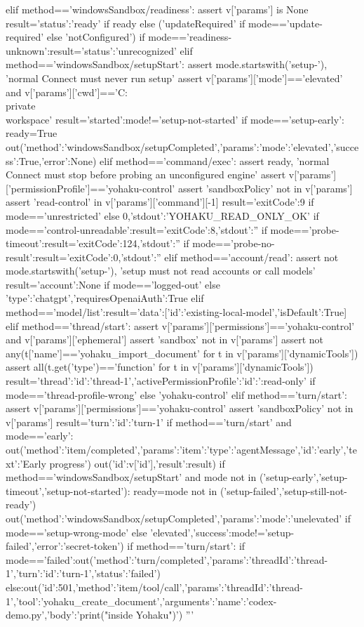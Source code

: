  elif method=='windowsSandbox/readiness':
  assert v['params'] is None
  result={'status':'ready' if ready else ('updateRequired' if mode=='update-required' else 'notConfigured')}
  if mode=='readiness-unknown':result={'status':'unrecognized'}
 elif method=='windowsSandbox/setupStart':
  assert mode.startswith('setup-'), 'normal Connect must never run setup'
  assert v['params']['mode']=='elevated' and v['params']['cwd']=='C:\\private\\workspace'
  result={'started':mode!='setup-not-started'}
  if mode=='setup-early':
   ready=True
   out({'method':'windowsSandbox/setupCompleted','params':{'mode':'elevated','success':True,'error':None}})
 elif method=='command/exec':
  assert ready, 'normal Connect must stop before probing an unconfigured engine'
  assert v['params']['permissionProfile']=='yohaku-control'
  assert 'sandboxPolicy' not in v['params']
  assert 'read-control' in v['params']['command'][-1]
  result={'exitCode':9 if mode=='unrestricted' else 0,'stdout':'YOHAKU_READ_ONLY_OK'}
  if mode=='control-unreadable':result={'exitCode':8,'stdout':''}
  if mode=='probe-timeout':result={'exitCode':124,'stdout':''}
  if mode=='probe-no-result':result={'exitCode':0,'stdout':''}
 elif method=='account/read':
  assert not mode.startswith('setup-'), 'setup must not read accounts or call models'
  result={'account':None if mode=='logged-out' else {'type':'chatgpt'},'requiresOpenaiAuth':True}
 elif method=='model/list':result={'data':[{'id':'existing-local-model','isDefault':True}]}
 elif method=='thread/start':
  assert v['params']['permissions']=='yohaku-control' and v['params']['ephemeral']
  assert 'sandbox' not in v['params']
  assert not any(t['name']=='yohaku_import_document' for t in v['params']['dynamicTools'])
  assert all(t.get('type')=='function' for t in v['params']['dynamicTools'])
  result={'thread':{'id':'thread-1'},'activePermissionProfile':{'id':':read-only' if mode=='thread-profile-wrong' else 'yohaku-control'}}
 elif method=='turn/start':
  assert v['params']['permissions']=='yohaku-control'
  assert 'sandboxPolicy' not in v['params']
  result={'turn':{'id':'turn-1'}}
 if method=='turn/start' and mode=='early':
  out({'method':'item/completed','params':{'item':{'type':'agentMessage','id':'early','text':'Early progress'}}})
 out({'id':v['id'],'result':result})
 if method=='windowsSandbox/setupStart' and mode not in ('setup-early','setup-timeout','setup-not-started'):
  ready=mode not in ('setup-failed','setup-still-not-ready')
  out({'method':'windowsSandbox/setupCompleted','params':{'mode':'unelevated' if mode=='setup-wrong-mode' else 'elevated','success':mode!='setup-failed','error':'secret-token'}})
 if method=='turn/start':
  if mode=='failed':out({'method':'turn/completed','params':{'threadId':'thread-1','turn':{'id':'turn-1','status':'failed'}}})
  else:out({'id':501,'method':'item/tool/call','params':{'threadId':'thread-1','tool':'yohaku_create_document','arguments':{'name':'codex-demo.py','body':'print("inside Yohaku")\n'}}})
'''

